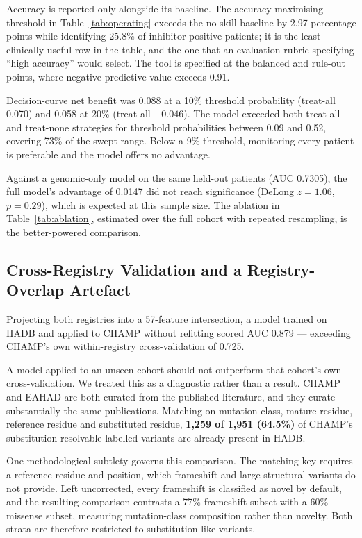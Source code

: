 \documentclass[conference]{IEEEtran}
\begin{document}
Accuracy is reported only alongside its baseline. The accuracy-maximising
threshold in Table~\ref{tab:operating} exceeds the no-skill baseline by 2.97
percentage points while identifying 25.8\% of inhibitor-positive patients; it
is the least clinically useful row in the table, and the one that an evaluation
rubric specifying ``high accuracy'' would select. The tool is specified at the
balanced and rule-out points, where negative predictive value exceeds 0.91.

Decision-curve net benefit was 0.088 at a 10\% threshold probability (treat-all
0.070) and 0.058 at 20\% (treat-all $-0.046$). The model exceeded both
treat-all and treat-none strategies for threshold probabilities between 0.09
and 0.52, covering 73\% of the swept range. Below a 9\% threshold, monitoring
every patient is preferable and the model offers no advantage.

Against a genomic-only model on the same held-out patients (AUC 0.7305), the
full model's advantage of 0.0147 did not reach significance (DeLong $z = 1.06$,
$p = 0.29$), which is expected at this sample size. The ablation in
Table~\ref{tab:ablation}, estimated over the full cohort with repeated
resampling, is the better-powered comparison.

\subsection{Cross-Registry Validation and a Registry-Overlap Artefact}
Projecting both registries into a 57-feature intersection, a model trained on
HADB and applied to CHAMP without refitting scored AUC 0.879 --- exceeding
CHAMP's own within-registry cross-validation of 0.725.

A model applied to an unseen cohort should not outperform that cohort's own
cross-validation. We treated this as a diagnostic rather than a result. CHAMP
and EAHAD are both curated from the published literature, and they curate
substantially the same publications. Matching on mutation class, mature
residue, reference residue and substituted residue, \textbf{1{,}259 of 1{,}951
(64.5\%)} of CHAMP's substitution-resolvable labelled variants are already
present in HADB.

One methodological subtlety governs this comparison. The matching key requires
a reference residue and position, which frameshift and large structural
variants do not provide. Left uncorrected, every frameshift is classified as
novel by default, and the resulting comparison contrasts a 77\%-frameshift
subset with a 60\%-missense subset, measuring mutation-class composition rather
than novelty. Both strata are therefore restricted to substitution-like
variants.
\end{document}
